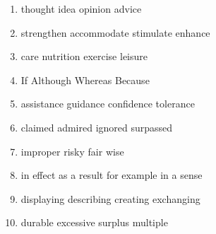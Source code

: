 \begin{enumerate}
	\item
\fourchoices
{thought}
{idea}
{opinion}
{advice}




\item

\fourchoices
{strengthen}
{accommodate}
{stimulate}
{enhance}



\item


\fourchoices
{care}
{nutrition}
{exercise}
{leisure}




\item


\fourchoices
{If}
{Although}
{Whereas}
{Because}




\item

\fourchoices
{assistance}
{guidance}
{confidence}
{tolerance}



\item


\fourchoices
{claimed}
{admired}
{ignored}
{surpassed}




\item


\fourchoices
{improper}
{risky}
{fair}
{wise}




\item


\fourchoices
{in effect}
{as a result}
{for example}
{in a sense}





\item

\fourchoices
{displaying}
{describing}
{creating}
{exchanging}



\item


\fourchoices
{durable}
{excessive}
{surplus}
{multiple}





\end{enumerate}
